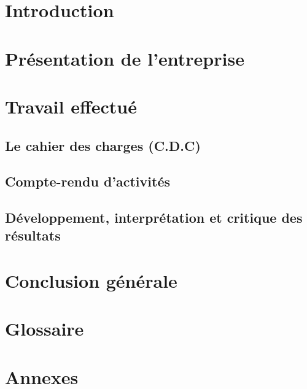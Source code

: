 \documentclass[12pt,a4paper]{report}
\begin{document}
\chapter{Introduction}


\chapter{Présentation de l'entreprise}


\chapter{Travail effectué}
\section{Le cahier des charges (C.D.C)}


\newpage

\section{Compte-rendu d'activités}


\newpage

\section{Développement, interprétation et critique des résultats}


\chapter{Conclusion générale}


\chapter{Glossaire}


\chapter{Annexes}
\end{document}
